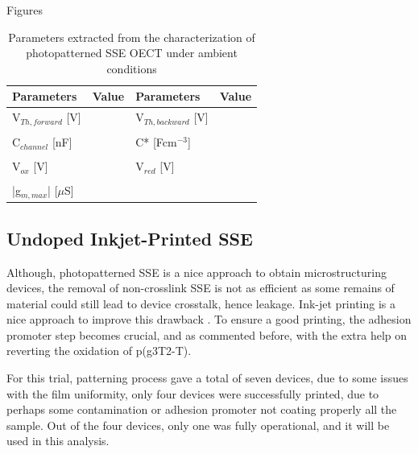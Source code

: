 Figures

\begin{table}[ht]
\centering
\caption{Parameters extracted from the characterization of photopatterned SSE OECT under ambient conditions}
\begin{tabular}{l|c||l|c}
Parameters & Value & Parameters & Value \\\hline \hline
V$_{Th,forward}$ [V] &  & V$_{Th,backward}$ [V] & \\
& & &\\[-1em]
C$_{channel}$ [nF] &  & C* [Fcm$^{-3}$] &  \\
& & &\\[-1em]
V$_{ox}$ [V] &  & V$_{red}$ [V] &  \\
& & &\\[-1em]
|g$_{m,max}$| [$\mu$S] & &  &\\\hline
\end{tabular}
\label{tab:photofom_amb}
\end{table}

\subsection{Undoped Inkjet-Printed SSE}%

Although, photopatterned SSE is a nice approach to obtain microstructuring devices, the removal of non-crosslink SSE is not as efficient as some remains of material could still lead to device crosstalk, hence leakage. Ink-jet printing is a nice approach to improve this drawback \cite{tsengThresholdVoltageControl2023}. To ensure a good printing, the adhesion promoter step becomes crucial, and as commented before, with the extra help on reverting the oxidation of p(g3T2-T).

For this trial, patterning process gave a total of seven devices, due to some issues with the film uniformity, only four devices were successfully printed, due to perhaps some contamination or adhesion promoter not coating properly all the sample. Out of the four devices, only one was fully operational, and it will be used in this analysis.

